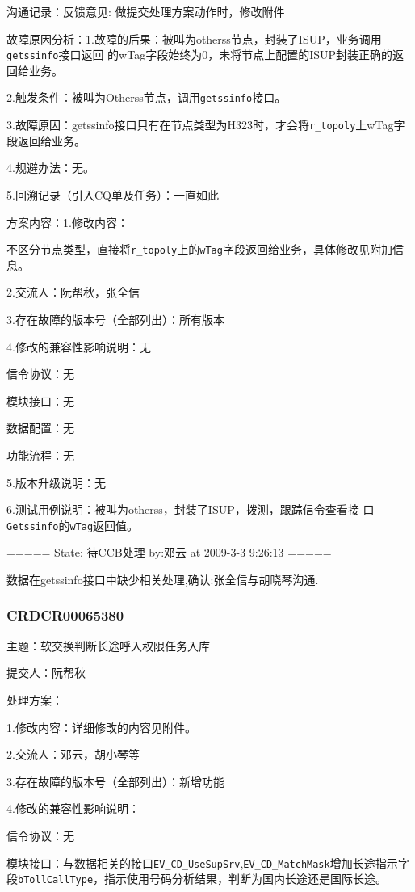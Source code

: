 \documentclass[12pt,a4paper,onecolumn]{article}
\begin{document}
沟通记录：反馈意见: 做提交处理方案动作时，修改附件 


故障原因分析：1.故障的后果：被叫为otherss节点，封装了ISUP，业务调用\lstinline{getssinfo}接口返回
的wTag字段始终为0，未将节点上配置的ISUP封装正确的返回给业务。

2.触发条件：被叫为Otherss节点，调用\lstinline{getssinfo}接口。

3.故障原因：getssinfo接口只有在节点类型为H323时，才会将\lstinline{r_topoly}上wTag字段返回给业务。 

4.规避办法：无。

5.回溯记录（引入CQ单及任务）：一直如此

方案内容：1.修改内容：

不区分节点类型，直接将\lstinline{r_topoly}上的\lstinline{wTag}字段返回给业务，具体修改见附加信息。

2.交流人：阮帮秋，张全信

3.存在故障的版本号（全部列出）：所有版本

4.修改的兼容性影响说明：无

信令协议：无

模块接口：无

数据配置：无

功能流程：无

5.版本升级说明：无

6.测试用例说明：被叫为otherss，封装了ISUP，拨测，跟踪信令查看接
口\lstinline{Getssinfo}的\lstinline{wTag}返回值。


===== State: 待CCB处理 by:邓云 at 2009-3-3 9:26:13 =====

数据在getssinfo接口中缺少相关处理,确认:张全信与胡晓琴沟通.



\subsubsection{CRDCR00065380}

主题：软交换判断长途呼入权限任务入库

提交人：阮帮秋

处理方案：

1.修改内容：详细修改的内容见附件。

2.交流人：邓云，胡小琴等

3.存在故障的版本号（全部列出）：新增功能

4.修改的兼容性影响说明：

信令协议：无

模块接口：与数据相关的接口\lstinline{EV_CD_UseSupSrv},\lstinline{EV_CD_MatchMask}增加长途指示字
段\lstinline{bTollCallType}，指示使用号码分析结果，判断为国内长途还是国际长途。
\end{document}
